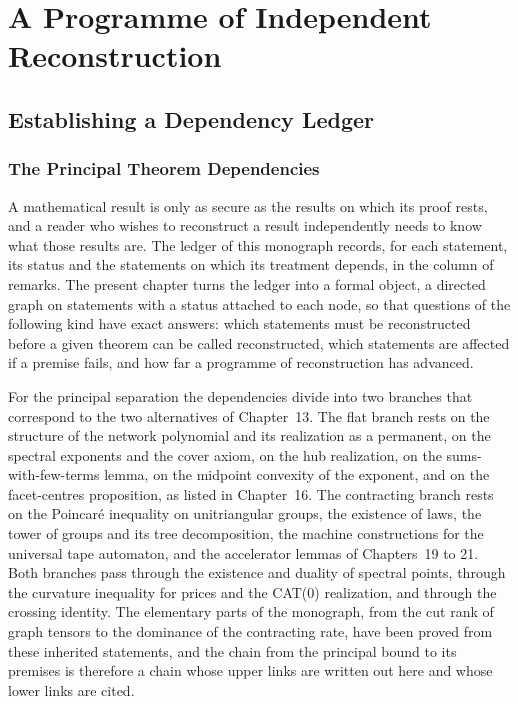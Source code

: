 \documentclass[11pt,letterpaper]{report}
\theoremstyle{plain}
\theoremstyle{definition}
\theoremstyle{remark}
\begin{document}
\part{A Programme of Independent Reconstruction}

\chapter{Establishing a Dependency Ledger}

\section{The Principal Theorem Dependencies}

A mathematical result is only as secure as the results on which its proof rests, and a reader who wishes to reconstruct a result independently needs to know what those results are. The ledger of this monograph records, for each statement, its status and the statements on which its treatment depends, in the column of remarks. The present chapter turns the ledger into a formal object, a directed graph on statements with a status attached to each node, so that questions of the following kind have exact answers: which statements must be reconstructed before a given theorem can be called reconstructed, which statements are affected if a premise fails, and how far a programme of reconstruction has advanced.

For the principal separation the dependencies divide into two branches that correspond to the two alternatives of Chapter~13. The flat branch rests on the structure of the network polynomial and its realization as a permanent, on the spectral exponents and the cover axiom, on the hub realization, on the sums-with-few-terms lemma, on the midpoint convexity of the exponent, and on the facet-centres proposition, as listed in Chapter~16. The contracting branch rests on the Poincar\'e inequality on unitriangular groups, the existence of laws, the tower of groups and its tree decomposition, the machine constructions for the universal tape automaton, and the accelerator lemmas of Chapters~19 to 21. Both branches pass through the existence and duality of spectral points, through the curvature inequality for prices and the CAT(0) realization, and through the crossing identity. The elementary parts of the monograph, from the cut rank of graph tensors to the dominance of the contracting rate, have been proved from these inherited statements, and the chain from the principal bound to its premises is therefore a chain whose upper links are written out here and whose lower links are cited.
\end{document}

